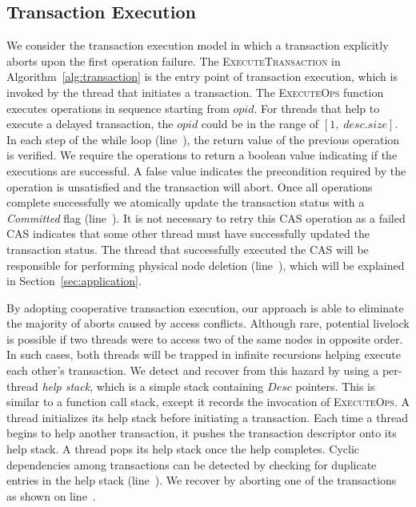 \documentclass{sig-alternate-05-2015}
\begin{document}
\subsection{Transaction Execution}
\label{sec:txnexec}
We consider the transaction execution model in which a transaction explicitly aborts upon the first operation failure.
The \textsc{ExecuteTransaction} in Algorithm~\ref{alg:transaction} is the entry point of transaction execution, which is invoked by the thread that initiates a transaction.
The \textsc{ExecuteOps} function executes operations in sequence starting from $opid$.
For threads that help to execute a delayed transaction, the $opid$ could be in the range of $[1,\;desc.size]$.
In each step of the while loop (line~), the return value of the previous operation is verified.
We require the operations to return a boolean value indicating if the executions are successful.
A false value indicates the precondition required by the operation is unsatisfied and the transaction will abort. 
Once all operations complete successfully we atomically update the transaction status with a \emph{Committed} flag (line~).
It is not necessary to retry this CAS operation as a failed CAS indicates that some other thread must have successfully updated the transaction status.
The thread that successfully executed the CAS will be responsible for performing physical node deletion (line~), which will be explained in Section~\ref{sec:application}.

By adopting cooperative transaction execution, our approach is able to eliminate the majority of aborts caused by access conflicts.
Although rare, potential livelock is possible if two threads were to access two of the same nodes in opposite order.
In such cases, both threads will be trapped in infinite recursions helping execute each other's transaction.
We detect and recover from this hazard by using a per-thread \emph{help stack}, which is a simple stack containing $Desc$ pointers. 
This is similar to a function call stack, except it records the invocation of \textsc{ExecuteOps}.
A thread initializes its help stack before initiating a transaction.
Each time a thread begins to help another transaction, it pushes the transaction descriptor onto its help stack.
A thread pops its help stack once the help completes.
Cyclic dependencies among transactions can be detected by checking for duplicate entries in the help stack (line~). 
We recover by aborting one of the transactions as shown on line~.
\end{document}
